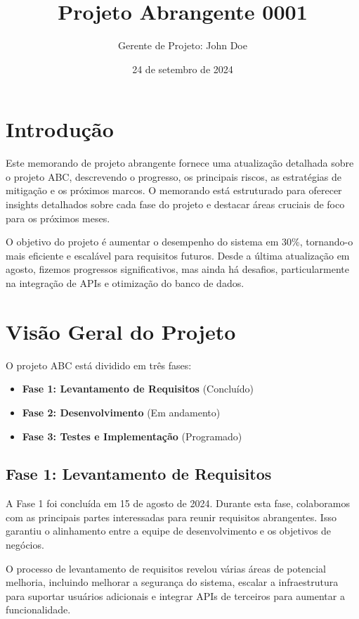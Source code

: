 \documentclass[12pt]{article}
\title{Projeto Abrangente 0001}
\author{Gerente de Projeto: John Doe}
\date{24 de setembro de 2024}
\begin{document}
\maketitle

\tableofcontents
\newpage

\section{Introdução}
Este memorando de projeto abrangente fornece uma atualização detalhada sobre o projeto ABC, descrevendo o progresso, os principais riscos, as estratégias de mitigação e os próximos marcos. O memorando está estruturado para oferecer insights detalhados sobre cada fase do projeto e destacar áreas cruciais de foco para os próximos meses.

O objetivo do projeto é aumentar o desempenho do sistema em 30\%, tornando-o mais eficiente e escalável para requisitos futuros. Desde a última atualização em agosto, fizemos progressos significativos, mas ainda há desafios, particularmente na integração de APIs e otimização do banco de dados.

\section{Visão Geral do Projeto}
O projeto ABC está dividido em três fases:
\begin{itemize}
    \item \textbf{Fase 1: Levantamento de Requisitos} (Concluído)
    \item \textbf{Fase 2: Desenvolvimento} (Em andamento)
    \item \textbf{Fase 3: Testes e Implementação} (Programado)
\end{itemize}

\subsection{Fase 1: Levantamento de Requisitos}
A Fase 1 foi concluída em 15 de agosto de 2024. Durante esta fase, colaboramos com as principais partes interessadas para reunir requisitos abrangentes. Isso garantiu o alinhamento entre a equipe de desenvolvimento e os objetivos de negócios.

O processo de levantamento de requisitos revelou várias áreas de potencial melhoria, incluindo melhorar a segurança do sistema, escalar a infraestrutura para suportar usuários adicionais e integrar APIs de terceiros para aumentar a funcionalidade.
\end{document}
